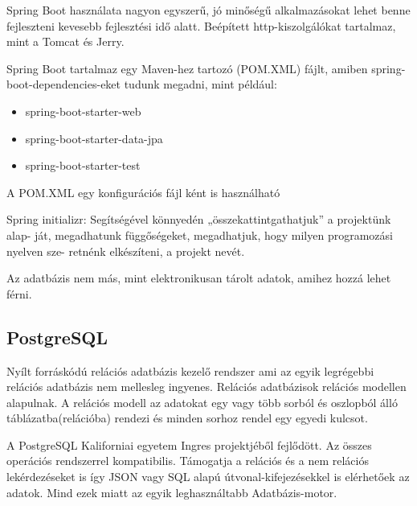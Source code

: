 Spring Boot használata nagyon egyszerű, jó minőségű alkalmazásokat lehet benne fejleszteni kevesebb fejlesztési idő alatt. Beépített http-kiszolgálókat tartalmaz, mint a Tomcat és Jerry.

Spring Boot tartalmaz egy Maven-hez tartozó (POM.XML) fájlt, amiben spring-boot-dependencies-eket tudunk megadni, mint például:

\begin{itemize}
\item spring-boot-starter-web
\item spring-boot-starter-data-jpa
\item spring-boot-starter-test
\end{itemize}

A POM.XML egy konfigurációs fájl ként is használható

Spring initializr: Segítségével könnyedén „összekattintgathatjuk” a projektünk alap-
ját, megadhatunk függőségeket, megadhatjuk, hogy milyen programozási nyelven sze-
retnénk elkészíteni, a projekt nevét.

Az adatbázis nem más, mint elektronikusan tárolt adatok, amihez hozzá lehet férni.


\subsection{PostgreSQL}

Nyílt forráskódú relációs adatbázis kezelő rendszer ami az egyik legrégebbi relációs adatbázis nem mellesleg ingyenes. Relációs adatbázisok relációs modellen alapulnak. A relációs modell az adatokat egy vagy több sorból és oszlopból álló táblázatba(relációba) rendezi és minden sorhoz rendel egy egyedi kulcsot.

A PostgreSQL Kaliforniai egyetem Ingres projektjéből fejlődött. Az összes operációs rendszerrel kompatibilis. Támogatja a relációs és a nem relációs lekérdezéseket is így JSON vagy SQL alapú útvonal-kifejezésekkel is elérhetőek az adatok.  Mind ezek miatt az egyik leghasználtabb Adatbázis-motor.

